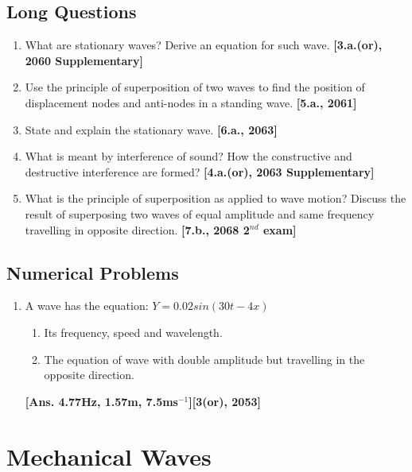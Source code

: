 \documentclass[a4paper,10pt]{report}
\begin{document}
 \subsection{Long Questions}
  \begin{enumerate}
   \item What are stationary waves? Derive an equation for such wave. \textbf{[3.a.(or), 2060 Supplementary]}
   \item Use the principle of superposition of two waves to find the position of displacement nodes 
    and anti-nodes in a standing wave. \textbf{[5.a., 2061]}
   \item State and explain the stationary wave. \textbf{[6.a., 2063]}
   \item What is meant by interference of sound? How the constructive and destructive interference are formed? 
    \textbf{[4.a.(or), 2063 Supplementary]}
   \item What is the principle of superposition as applied to wave motion? 
    Discuss the result of superposing two waves of equal amplitude and same frequency travelling in opposite 
    direction. \textbf{[7.b., 2068 2$^{nd}$ exam]}
  \end{enumerate}

 \subsection{Numerical Problems}
  \begin{enumerate} 
   \item A wave has the equation: $Y=0.02 sin(30t-4x)$
    \begin{enumerate} 
     \item Its frequency, speed and wavelength.
     \item The equation of wave with double amplitude but travelling in the opposite direction.
    \end{enumerate} \textbf{[Ans. 4.77Hz, 1.57m, 7.5ms$^{-1}$][3(or), 2053]}
  \end{enumerate}

\section{Mechanical Waves}
\end{document}
